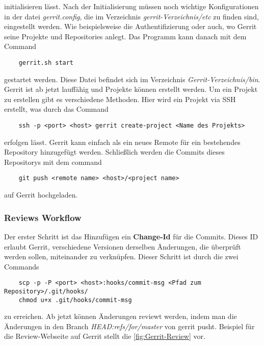 \noindent initialisieren lässt. Nach der Initialisierung müssen noch wichtige Konfigurationen in der datei \textit{gerrit.config}, die im Verzeichnis \textit{gerrit-Verzeichnis/etc} zu finden sind, eingestellt werden. Wie beispielsweise die Authentifizierung oder auch, wo Gerrit seine Projekte und Repositories anlegt. Das Programm kann danach mit dem Command

{\color{blue} 
\begin{verbatim}
	gerrit.sh start
\end{verbatim}}

\noindent gestartet werden. Diese Datei befindet sich im Verzeichnis \textit{Gerrit-Verzeichnis/bin}. Gerrit ist ab jetzt lauffähig und Projekte können erstellt werden. Um ein Projekt zu erstellen gibt es verschiedene Methoden. Hier wird ein Projekt via SSH erstellt, was durch das Command

{\color{blue}
\begin{verbatim}
	ssh -p <port> <host> gerrit create-project <Name des Projekts>
\end{verbatim}}

\noindent erfolgen lässt. Gerrit kann einfach als ein neues Remote für ein bestehendes Repository hinzugefügt werden. Schließlich werden die Commits dieses Repositorys mit dem command

{\color{blue}
\begin{verbatim}
	git push <remote name> <host>/<project name>
\end{verbatim}}

\noindent auf Gerrit hochgeladen.

\subsubsection{Reviews Workflow}
\label{subsubsec:Reviews Workflow bei Gerrit}

Der erster Schritt ist das Hinzufügen ein \textbf{Change-Id} für die Commits. Dieses ID erlaubt Gerrit, verschiedene Versionen derselben Änderungen, die überprüft werden sollen, miteinander zu verknüpfen. Dieser Schritt ist durch die zwei Commands

{\color{blue}
\begin{verbatim}
	scp -p -P <port> <host>:hooks/commit-msg <Pfad zum Repository>/.git/hooks/
	chmod u+x .git/hooks/commit-msg
\end{verbatim}}

\noindent zu erreichen. Ab jetzt können Änderungen reviewt werden, indem man die Änderungen in den Branch \textit{HEAD:refs/for/master} von gerrit pusht. Beispiel für die Review-Webseite auf Gerrit stellt die \cref{fig:Gerrit-Review} vor.

